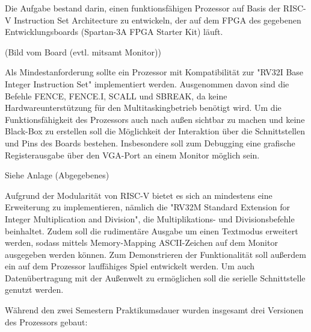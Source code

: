 

Die Aufgabe bestand darin, einen funktionsf\"ahigen Prozessor auf Basis der RISC-V Instruction Set Architecture zu entwickeln, der auf dem FPGA des gegebenen Entwicklungsboards (Spartan-3A FPGA Starter Kit) l\"auft. 



(Bild vom Board (evtl. mitsamt Monitor))


Als Mindestanforderung sollte ein Prozessor mit Kompatibilit\"at zur "RV32I Base Integer Instruction Set" implementiert werden. Ausgenommen davon sind die Befehle FENCE, FENCE.I, SCALL und SBREAK, da keine Hardwareunterst\"utzung f\"ur den Multitaskingbetrieb ben\"otigt wird.
Um die Funktionsf\"ahigkeit des Prozessors auch nach au{\ss}en sichtbar zu machen und keine Black-Box zu erstellen soll die M\"oglichkeit der Interaktion \"uber die Schnittstellen und Pins des Boards bestehen. Insbesondere soll zum Debugging eine grafische Registerausgabe \"uber den VGA-Port an einem Monitor m\"oglich sein.



Siehe Anlage (Abgegebenes)


Aufgrund der Modularit\"at von RISC-V bietet es sich an mindestens eine Erweiterung zu implementieren, n\"amlich die "RV32M Standard Extension for Integer Multiplication and Division", die Multiplikations- und Divisionsbefehle beinhaltet. Zudem soll die rudiment\"are Ausgabe um einen Textmodus erweitert werden, sodass mittels Memory-Mapping ASCII-Zeichen auf dem Monitor ausgegeben werden k\"onnen. Zum Demonstrieren der Funktionalit\"at soll au{\ss}erdem ein auf dem Prozessor lauff\"ahiges Spiel entwickelt werden. Um auch Daten\"ubertragung mit der Au{\ss}enwelt zu erm\"oglichen soll die serielle Schnittstelle genutzt werden.

W\"ahrend den zwei Semestern Praktikumsdauer wurden insgesamt drei Versionen des Prozessors gebaut:



